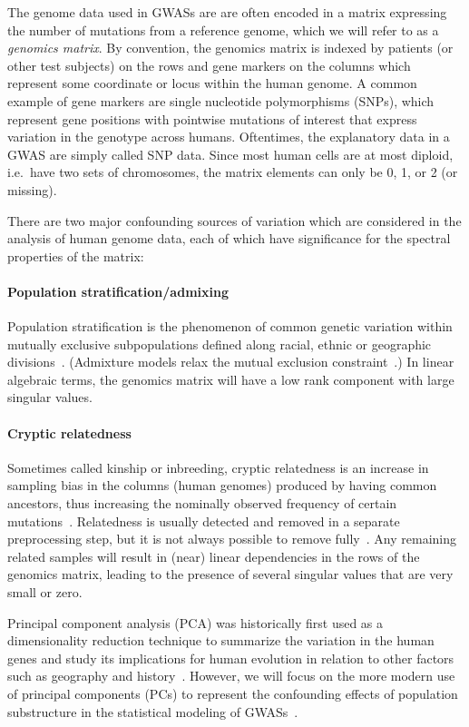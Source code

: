 \documentclass[review]{siamart0516}
\begin{document}
The genome data used in
GWASs are are often encoded in a matrix expressing the number of mutations
from a reference genome, which we will refer to as a \textit{genomics matrix}.
By convention, the genomics matrix is indexed by patients (or other test
subjects) on the rows and gene markers on the columns which represent some
coordinate or locus within the human genome. A common example of gene markers are
single nucleotide polymorphisms (SNPs), which represent gene positions with
pointwise mutations of interest that express variation in the genotype across
humans. Oftentimes, the explanatory data in a GWAS are simply called SNP data.
Since most human cells are at most diploid, i.e.\ have two sets of chromosomes,
the matrix elements can only be 0, 1, or 2 (or missing).

There are two major confounding sources of variation which are considered in
the analysis of human genome data, each of which have significance for the
spectral properties of the matrix:

\paragraph{Population stratification/admixing}
Population stratification is the phenomenon of common genetic variation within
mutually exclusive subpopulations defined along racial, ethnic or geographic
divisions~\cite{Pritchard1999,Cardon2003}. (Admixture models relax the mutual
exclusion constraint~\cite{Devlin1999,Sankararaman2008}.)
In linear algebraic terms, the genomics matrix will have a low rank component
with large singular values.

\paragraph{Cryptic relatedness}
Sometimes called kinship or inbreeding, cryptic relatedness is an increase in
sampling bias in the columns (human genomes) produced by having common ancestors,
thus increasing the nominally observed frequency of certain
mutations~\cite{Voight2005,Astle2009}. Relatedness is usually detected and removed in
a separate preprocessing step, but it is not always possible to remove
fully~\cite{PLINK}. Any remaining related samples will
result in (near) linear dependencies in the rows of the genomics matrix,
leading to the presence of several singular values that are very small or zero.

Principal component analysis (PCA) was historically first used as a dimensionality
reduction technique to summarize the variation in the human genes and study its
implications for human evolution in relation to other factors such as
geography and history~\cite{Menozzi1978,Cavalli1994,Novembre2008}.
However, we will focus on the more modern use of principal components (PCs) to
represent the confounding effects of population substructure in the statistical
modeling of GWASs~\cite{Chen2003,Patterson2006,Price2006,Zhu2002,Zhang2003}.
\end{document}

